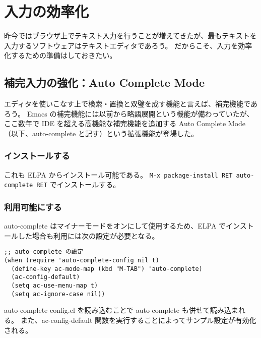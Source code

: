 \section{入力の効率化}
昨今ではブラウザ上でテキスト入力を行うことが増えてきたが、最もテキストを入力するソフトウェアはテキストエディタであろう。
だからこそ、入力を効率化するための準備はしておきたい。
\subsection{補完入力の強化：Auto Complete Mode}
エディタを使いこなす上で検索・置換と双璧を成す機能と言えば、補完機能であろう。
Emacs の補完機能には以前から略語展開という機能が備わっていたが、ここ数年で IDE を超える高機能な補完機能を追加する Auto Complete Mode（以下、auto-complete と記す）という拡張機能が登場した。
\subsubsection{インストールする}
これも ELPA からインストール可能である。
\texttt{M-x package-install RET auto-complete RET} でインストールする。
\subsubsection{利用可能にする}
auto-complete はマイナーモードをオンにして使用するため、ELPA でインストールした場合も利用には次の設定が必要となる。\enlargethispage{0.90zw}
\begin{mdframed}[roundcorner=0.50zw,leftmargin=3.00zw,rightmargin=3.00zw,skipabove=0.40zw,skipbelow=0.40zw,innertopmargin=4.00pt,innerbottommargin=4.00pt,innerleftmargin=5.00pt,innerrightmargin=5.00pt,linecolor=gray!020,linewidth=0.50pt,backgroundcolor=gray!20]
\begin{verbatim}
;; auto-complete の設定
(when (require 'auto-complete-config nil t)
  (define-key ac-mode-map (kbd "M-TAB") 'auto-complete)
  (ac-config-default)
  (setq ac-use-menu-map t)
  (setq ac-ignore-case nil))
\end{verbatim}
\end{mdframed}
auto-complete-config.el を読み込むことで auto-complete も併せて読み込まれる。
また、ac-config-default 関数を実行することによってサンプル設定が有効化される。
